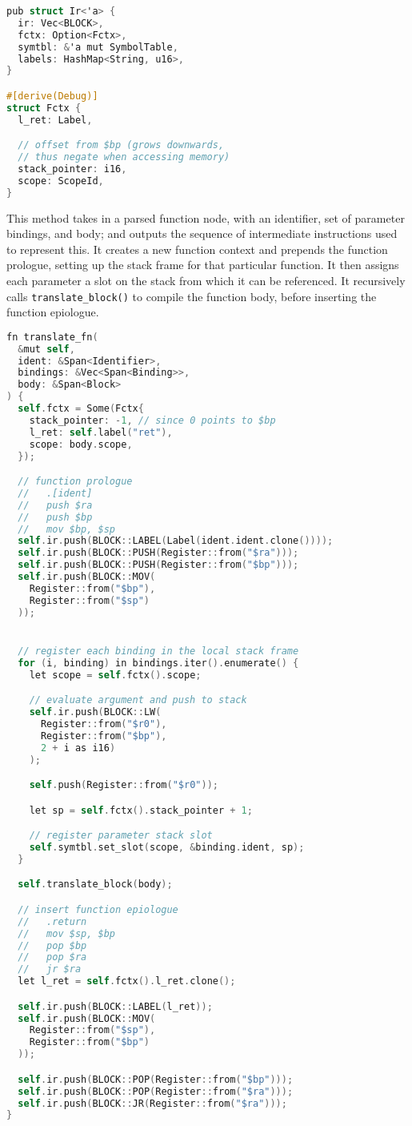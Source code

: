 \begin{lstlisting}[language=C]
pub struct Ir<'a> {
  ir: Vec<BLOCK>,
  fctx: Option<Fctx>,
  symtbl: &'a mut SymbolTable,
  labels: HashMap<String, u16>,
}

#[derive(Debug)]
struct Fctx {
  l_ret: Label,

  // offset from $bp (grows downwards, 
  // thus negate when accessing memory)
  stack_pointer: i16, 
  scope: ScopeId,
}
\end{lstlisting}

This method takes in a parsed function node, with an identifier, set of parameter bindings, and body; and outputs the sequence of intermediate instructions used to represent this. It creates a new function context and prepends the function prologue, setting up the stack frame for that particular function. It then assigns each parameter a slot on the stack from which it can be referenced. It recursively calls \texttt{translate\_block()} to compile the function body, before inserting the function epiologue.

\begin{lstlisting}[language=C]
fn translate_fn(
  &mut self, 
  ident: &Span<Identifier>, 
  bindings: &Vec<Span<Binding>>, 
  body: &Span<Block>
) {
  self.fctx = Some(Fctx{
    stack_pointer: -1, // since 0 points to $bp
    l_ret: self.label("ret"),
    scope: body.scope,
  });

  // function prologue
  //   .[ident]
  //   push $ra 
  //   push $bp
  //   mov $bp, $sp
  self.ir.push(BLOCK::LABEL(Label(ident.ident.clone())));
  self.ir.push(BLOCK::PUSH(Register::from("$ra")));
  self.ir.push(BLOCK::PUSH(Register::from("$bp")));
  self.ir.push(BLOCK::MOV(
    Register::from("$bp"), 
    Register::from("$sp")
  ));


  // register each binding in the local stack frame
  for (i, binding) in bindings.iter().enumerate() {
    let scope = self.fctx().scope;

    // evaluate argument and push to stack 
    self.ir.push(BLOCK::LW(
      Register::from("$r0"), 
      Register::from("$bp"), 
      2 + i as i16)
    );

    self.push(Register::from("$r0"));

    let sp = self.fctx().stack_pointer + 1; 

    // register parameter stack slot 
    self.symtbl.set_slot(scope, &binding.ident, sp);
  }

  self.translate_block(body);

  // insert function epiologue
  //   .return
  //   mov $sp, $bp
  //   pop $bp
  //   pop $ra
  //   jr $ra
  let l_ret = self.fctx().l_ret.clone();

  self.ir.push(BLOCK::LABEL(l_ret));
  self.ir.push(BLOCK::MOV(
    Register::from("$sp"), 
    Register::from("$bp")
  ));

  self.ir.push(BLOCK::POP(Register::from("$bp")));
  self.ir.push(BLOCK::POP(Register::from("$ra")));
  self.ir.push(BLOCK::JR(Register::from("$ra")));
}
\end{lstlisting}

